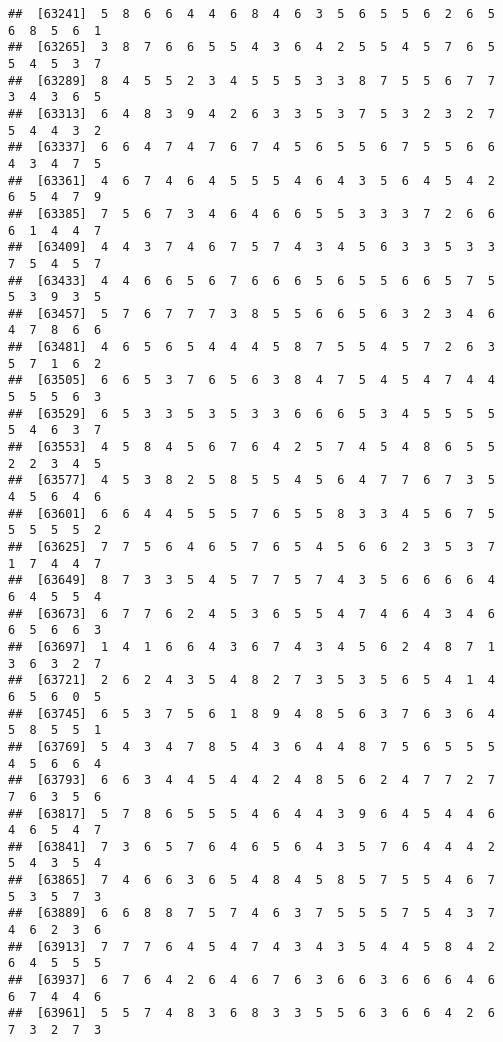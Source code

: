 \documentclass[
]{book}
\begin{document}
\begin{verbatim}
##  [63241]  5  8  6  6  4  4  6  8  4  6  3  5  6  5  5  6  2  6  5  6  8  5  6  1
##  [63265]  3  8  7  6  6  5  5  4  3  6  4  2  5  5  4  5  7  6  5  5  4  5  3  7
##  [63289]  8  4  5  5  2  3  4  5  5  5  3  3  8  7  5  5  6  7  7  3  4  3  6  5
##  [63313]  6  4  8  3  9  4  2  6  3  3  5  3  7  5  3  2  3  2  7  5  4  4  3  2
##  [63337]  6  6  4  7  4  7  6  7  4  5  6  5  5  6  7  5  5  6  6  4  3  4  7  5
##  [63361]  4  6  7  4  6  4  5  5  5  4  6  4  3  5  6  4  5  4  2  6  5  4  7  9
##  [63385]  7  5  6  7  3  4  6  4  6  6  5  5  3  3  3  7  2  6  6  6  1  4  4  7
##  [63409]  4  4  3  7  4  6  7  5  7  4  3  4  5  6  3  3  5  3  3  7  5  4  5  7
##  [63433]  4  4  6  6  5  6  7  6  6  6  5  6  5  5  6  6  5  7  5  5  3  9  3  5
##  [63457]  5  7  6  7  7  7  3  8  5  5  6  6  5  6  3  2  3  4  6  4  7  8  6  6
##  [63481]  4  6  5  6  5  4  4  4  5  8  7  5  5  4  5  7  2  6  3  5  7  1  6  2
##  [63505]  6  6  5  3  7  6  5  6  3  8  4  7  5  4  5  4  7  4  4  5  5  5  6  3
##  [63529]  6  5  3  3  5  3  5  3  3  6  6  6  5  3  4  5  5  5  5  5  4  6  3  7
##  [63553]  4  5  8  4  5  6  7  6  4  2  5  7  4  5  4  8  6  5  5  2  2  3  4  5
##  [63577]  4  5  3  8  2  5  8  5  5  4  5  6  4  7  7  6  7  3  5  4  5  6  4  6
##  [63601]  6  6  4  4  5  5  5  7  6  5  5  8  3  3  4  5  6  7  5  5  5  5  5  2
##  [63625]  7  7  5  6  4  6  5  7  6  5  4  5  6  6  2  3  5  3  7  1  7  4  4  7
##  [63649]  8  7  3  3  5  4  5  7  7  5  7  4  3  5  6  6  6  6  4  6  4  5  5  4
##  [63673]  6  7  7  6  2  4  5  3  6  5  5  4  7  4  6  4  3  4  6  6  5  6  6  3
##  [63697]  1  4  1  6  6  4  3  6  7  4  3  4  5  6  2  4  8  7  1  3  6  3  2  7
##  [63721]  2  6  2  4  3  5  4  8  2  7  3  5  3  5  6  5  4  1  4  6  5  6  0  5
##  [63745]  6  5  3  7  5  6  1  8  9  4  8  5  6  3  7  6  3  6  4  5  8  5  5  1
##  [63769]  5  4  3  4  7  8  5  4  3  6  4  4  8  7  5  6  5  5  5  4  5  6  6  4
##  [63793]  6  6  3  4  4  5  4  4  2  4  8  5  6  2  4  7  7  2  7  7  6  3  5  6
##  [63817]  5  7  8  6  5  5  5  4  6  4  4  3  9  6  4  5  4  4  6  4  6  5  4  7
##  [63841]  7  3  6  5  7  6  4  6  5  6  4  3  5  7  6  4  4  4  2  5  4  3  5  4
##  [63865]  7  4  6  6  3  6  5  4  8  4  5  8  5  7  5  5  4  6  7  5  3  5  7  3
##  [63889]  6  6  8  8  7  5  7  4  6  3  7  5  5  5  7  5  4  3  7  4  6  2  3  6
##  [63913]  7  7  7  6  4  5  4  7  4  3  4  3  5  4  4  5  8  4  2  6  4  5  5  5
##  [63937]  6  7  6  4  2  6  4  6  7  6  3  6  6  3  6  6  6  4  6  6  7  4  4  6
##  [63961]  5  5  7  4  8  3  6  8  3  3  5  5  6  3  6  6  4  2  6  7  3  2  7  3

\end{verbatim}
\end{document}
